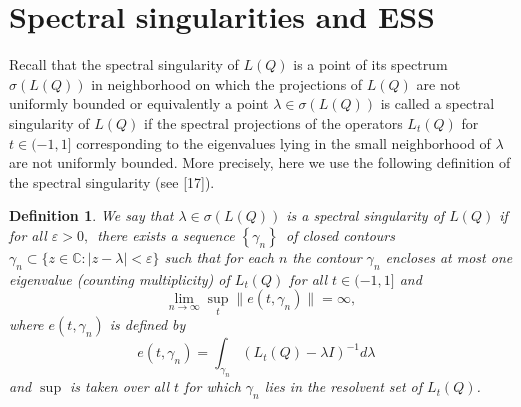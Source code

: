 \documentclass{article}%
\newtheorem{definition}{Definition}
\begin{document}
\section{Spectral singularities and ESS}

Recall that the spectral singularity of $L(Q)$ is a point of its spectrum
$\sigma(L(Q))$ in neighborhood on which the projections of $L(Q)$ are not
uniformly bounded or equivalently a point $\lambda\in\sigma(L(Q))$ is called a
spectral singularity of $L(Q)$ if the spectral projections of the operators
$L_{t}(Q)$ for $t\in(-1,1]$ corresponding to the eigenvalues lying in the
small neighborhood of $\lambda$ are not uniformly bounded. More precisely,
here we use the following definition of the spectral singularity (see [17]).

\begin{definition}
We say that $\lambda\in\sigma(L(Q))$ is a spectral singularity of $L(Q)$ if
for all $\varepsilon>0,$\ there exists a sequence $\left\{  \gamma
_{n}\right\}  $\ of closed contours $\gamma_{n}\subset\{z\in\mathbb{C}:\mid
z-\lambda\mid<\varepsilon\}$ such that for each $n$ the contour $\gamma_{n}$
encloses at most one eigenvalue (counting multiplicity) of $L_{t}(Q)$ for all
$t\in(-1,1]$ and
\[
\lim_{n\rightarrow\infty}\sup_{t}\parallel e(t,\gamma_{n})\parallel=\infty,
\]
where $e(t,\gamma_{n})$ is defined by
\[
e(t,\gamma_{n})=\int_{\gamma_{n}}\left(  L_{t}(Q)-\lambda I\right)
^{-1}d\lambda\text{ }%
\]
and $\sup$ is taken over all $t$ for which $\gamma_{n}$ lies in the resolvent
set of $L_{t}(Q)$.
\end{definition}
\end{document}
